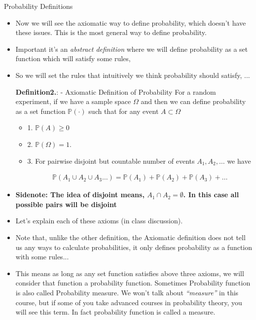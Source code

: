 \documentclass[8pt, usepdftitle = false]{beamer}
\newcounter{mytheorem}
\renewcommand{\themytheorem}{2.\arabic{mytheorem}}
\newcommand{\Thm}[1]{\refstepcounter{mytheorem}\textbf{#1\color{blue}\themytheorem}:}
\begin{document}
\begin{frame}[allowframebreaks]{Probability Definitions}
\begin{itemize}
\item Now we will see the axiomatic way to define probability, which doesn't have these issues. This is the most general way to define probability.


\item Important it's an \emph{abstract definition} where we will define probability as a \alert{set function} which will satisfy some rules, 


\item So we will set the rules that intuitively we think probability should satisfy, ...


\framebreak





\begin{varblock}{\Thm{Definition} - Axiomatic Definition of Probability}
For a random experiment, if we have a sample space $\Omega$ and then we can define probability as a \alert{set function} $\mathbb{P}(\cdot)$ such that for any event $A \subset \Omega$

\begin{itemize}
\item 1. $\mathbb{P}(A) \geq 0$ 
\item 2.  $\mathbb{P}(\Omega)=1$.
\item 3.  For \alert{pairwise disjoint but countable number of events} $A_1, A_2, \ldots$ we have

\begin{align*}
\mathbb{P}\left(A_1 \cup A_2 \cup A_3 \ldots \right)= \mathbb{P}\left(A_1\right) + \mathbb{P}\left(A_2\right) + \mathbb{P}\left(A_3\right) + \ldots
\end{align*}
\end{itemize}
\end{varblock}

\item[] \textbf{Sidenote: The idea of disjoint means,  $A_1 \cap A_2 = \emptyset$. In this case all possible pairs will be disjoint}


\item Let's explain each of these axioms (in class discussion).

\framebreak

\item Note that, unlike the other definition, the Axiomatic definition does not tell us any ways to calculate probabilities, it only defines probability as a function with some rules...

\item This means as long as any set function satisfies above three axioms, we will consider that function a probability function. Sometimes Probability function is also called \alert{Probability measure}. We won't talk about \emph{``measure''} in this course, but if some of you take advanced courses in probability theory, you will see this term. In fact probability function is called a measure.




\end{itemize}
\end{frame}
\end{document}
